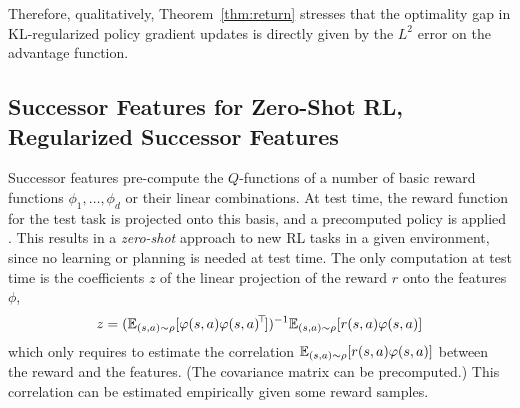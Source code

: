 \documentclass[11pt,a4paper]{article}
\newcommand{\option}[1]{{\color[rgb]{.4,0,.8}[Optional:#1]}} %
\renewcommand{\option}[1]{}  %
\begin{document}
Therefore, qualitatively, Theorem~\ref{thm:return} stresses that the
optimality gap in KL-regularized policy gradient updates is directly given by
the $L^2$ error on the advantage function. \option{make a formal
statement with natural policy gradient}


\subsection{Successor Features for Zero-Shot RL, Regularized Successor
Features}

% 
% 
% 
% 
% 

Successor features pre-compute the $Q$-functions of a number of basic reward
functions $\phi_1,\ldots,\phi_d$ or their linear combinations. At test
time, the reward function for the test task is projected onto this basis,
and a precomputed policy is applied
\cite{barreto2017successor,borsa2018universal}. This results in a
\emph{zero-shot} approach to new RL tasks in a given environment, since
no learning or planning is needed at test time. The only computation at
test time is the coefficients $z$ of the linear projection of the reward
$r$ onto the features $\phi$,
\begin{equation}
z=(\mathbb{E}_{(s,a)\sim \rho} [\varphi(s,a)\varphi(s,a)^{\!\top}\!])^{-1}
\mathbb{E}_{(s,a)\sim \rho}[r(s,a)\varphi(s,a)]
\end{equation}
which only requires to estimate the correlation $\mathbb{E}_{(s,a)\sim
\rho}[r(s,a)\varphi(s,a)]$ between the reward and the features. (The
covariance matrix can be precomputed.) This correlation can be estimated
empirically given some reward samples.
\end{document}
